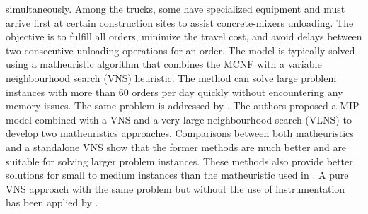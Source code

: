 \documentclass{article}
\begin{document}
{simultaneously. Among the trucks, some have specialized equipment and must arrive first at certain construction sites to assist concrete-mixers unloading. The objective is to fulfill all orders, minimize the travel cost, and avoid delays between two consecutive unloading operations for an order. The model is typically solved using a matheuristic algorithm that combines the MCNF with a variable neighbourhood search (VNS) heuristic. The method can solve large problem instances with more than 60 orders per day quickly without encountering any memory issues. The same problem is addressed by \cite{schmid2010hybridization}. The authors proposed a MIP model combined with a VNS and a very large neighbourhood search (VLNS) to develop two matheuristics approaches. Comparisons between both matheuristics and a standalone VNS show that the former methods are much better and are suitable for solving larger problem instances. These methods also provide better solutions for small to medium instances than the matheuristic used in \cite{schmid2009hybrid}. A pure VNS approach with the same problem but without the use of instrumentation has been applied by \cite{payr2009optimizing}. 

}
\end{document}
